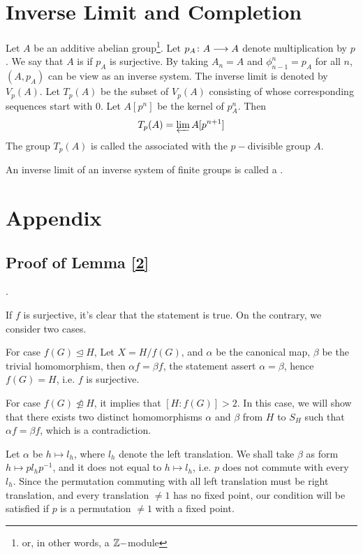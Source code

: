 \newpage\section{Inverse Limit and Completion}
  \begin{defn}
    Let $A$ be an additive abelian group\footnote{or, in other words, a ${\mathbb Z}-$module}.
    Let $p_A\colon A\longrightarrow A$ denote multiplication by $p$.
    We say that $A$ is  if $p_A$ is surjective.
    By taking $A_n=A$ and $\phi^n_{n-1}=p_A$ for all $n$, $(A,p_A)$ can be view as an inverse system. The inverse limit is denoted by $V_p(A)$.
    Let $T_p(A)$ be the subset of $V_p(A)$ consisting of whose corresponding sequences start with $0$.
    Let $A[p^n]$ be the kernel of $p_A^n$. Then
    \begin{equation*}
      T_p(A) = \operatorname*{\underleftarrow{\lim}} A[p^{n+1}]
    \end{equation*}
    The group $T_p(A)$ is called the  associated with the $p-$divisible group $A$.
  \end{defn}

  \begin{defn}
    An inverse limit of an inverse system of finite groups is called a .
  \end{defn}

\newpage\section{Appendix}
\subsection{Proof of Lemma \ref{2}}
\cite{jacobson1980basic}.

If $f$ is surjective, it's clear that the statement is true. On the contrary, we consider two cases.

For case $f(G)\trianglelefteq H$, Let $X=H/f(G)$, and $\alpha$ be the canonical map, $\beta$ be the trivial homomorphism, then $\alpha f=\beta f$, the statement assert $\alpha=\beta$, hence $f(G)=H$, i.e. $f$ is surjective.

For case $f(G)\ntrianglelefteq H$, it implies that $[H:f(G)]>2$. In this case, we will show that there exists two distinct homomorphisms $\alpha$ and $\beta$ from $H$ to $S_H$ such that $\alpha f=\beta f$, which is a contradiction.

Let $\alpha$ be $h\mapsto l_h$, where $l_h$ denote the left translation.
We shall take $\beta$ as form $h\mapsto pl_hp^{-1}$, and it does not equal to $h\mapsto l_h$, i.e. $p$ does not commute with every $l_h$.
Since the permutation commuting with all left translation must be right translation, and every translation $\neq1$ has no fixed point, our condition will be satisfied if $p$ is a permutation $\neq1$ with a fixed point.

